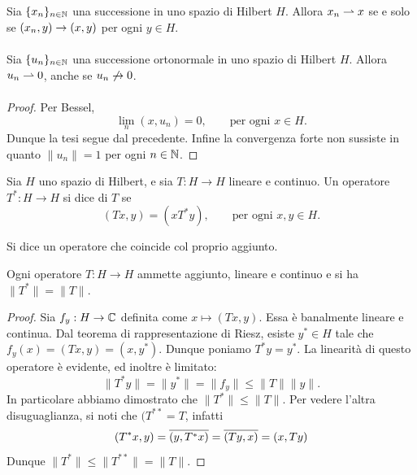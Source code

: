 \begin{corollary}
	Sia $\{x_n\}_{n \in \mathbb{N}}$ una successione in uno spazio di Hilbert $H$.
	Allora $x_n \rightharpoonup x$ se e solo se $(x_n, y) \underset{{}}{\rightarrow} (x,y)$ per ogni $y \in H$.
\end{corollary}

\begin{corollary}
	Sia $\{u_n\}_{n \in \mathbb{N}}$ una successione ortonormale in uno spazio di Hilbert $H$.
	Allora $u_n \rightharpoonup 0$, anche se $u_n \not\underset{{}}{\rightarrow} 0$.
\end{corollary}
\begin{proof}
	Per Bessel,
	\begin{equation*}
		\lim_n (x, u_n) = 0, \qquad \text{per ogni $x \in H$}.
	\end{equation*}
	Dunque la tesi segue dal precedente. Infine la convergenza forte non sussiste in quanto $\|u_n\| = 1$ per ogni $n \in \mathbb{N}$.
\end{proof}

\begin{definition}
	Sia $H$ uno spazio di Hilbert, e sia $T:H \to H$ lineare e continuo.
	Un operatore $T^* : H \to H$ si dice  di $T$ se
	\begin{equation*}
		(Tx, y) = (x T^* y), \qquad \text{per ogni $x,y \in H$}.
	\end{equation*}
\end{definition}

\begin{definition}
	Si dice  un operatore che coincide col proprio aggiunto.
\end{definition}

\begin{lemma}
	Ogni operatore $T:H \to H$ ammette aggiunto, lineare e continuo e si ha $\|T^*\|=\|T\|$.
\end{lemma}
\begin{proof}
	Sia $f_y : H \to \mathbb{C}$ definita come $x \mapsto (Tx, y)$. Essa è banalmente lineare e continua. Dal teorema di rappresentazione di Riesz, esiste $y^* \in H$ tale che $f_y(x) = (Tx,y) =(x, y^*)$. Dunque poniamo $T^* y = y^*$. La linearità di questo operatore è evidente, ed inoltre è limitato:
	\begin{equation*}
		\|T^* y\| = \|y^*\| = \|f_y\| \leq \|T\|\|y\|.
	\end{equation*}
	In particolare abbiamo dimostrato che $\|T^*\| \leq \|T\|$. Per vedere l'altra disuguaglianza, si noti che $(T^{**} = T$, infatti
	\begin{equation*}
		(T^*x, y) = \overline{(y, T^*x)} = \overline{(Ty, x)} = (x, Ty)
	\end{equation*}
	Dunque $\|T^*\| \leq \|T^{**}\| = \|T\|$.
\end{proof}

